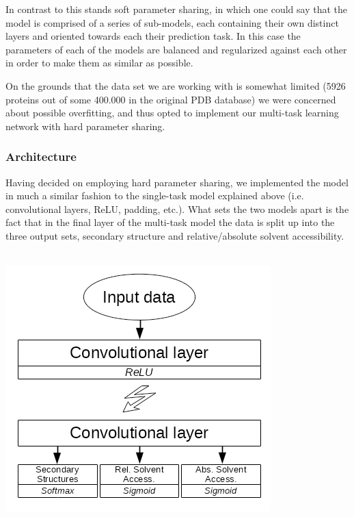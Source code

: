 \begin{multicols}{2}
In contrast to this stands soft parameter sharing, in which one could say that the model is comprised of a series of sub-models, each containing their own distinct layers and oriented towards each their prediction task. In this case the parameters of each of the models are balanced and regularized against each other in order to make them as similar as possible.

On the grounds that the data set we are working with is somewhat limited (5926 proteins out of some 400.000 in the original PDB database) we were concerned about possible overfitting, and thus opted to implement our multi-task learning network with hard parameter sharing.

\subsubsection{Architecture}
Having decided on employing hard parameter sharing, we implemented the model in much a similar fashion to the single-task model explained above (i.e. convolutional layers, ReLU, padding, etc.). What sets the two models apart is the fact that in the final layer of the multi-task model the data is split up into the three output sets, secondary structure and relative/absolute solvent accessibility.\\
\\

\begin{Figure}
 \centering
 \includegraphics[width=\linewidth]{../graphs/arch}
 \captionsetup{width=0.8\linewidth, font=small}
\end{Figure}


\end{multicols}
